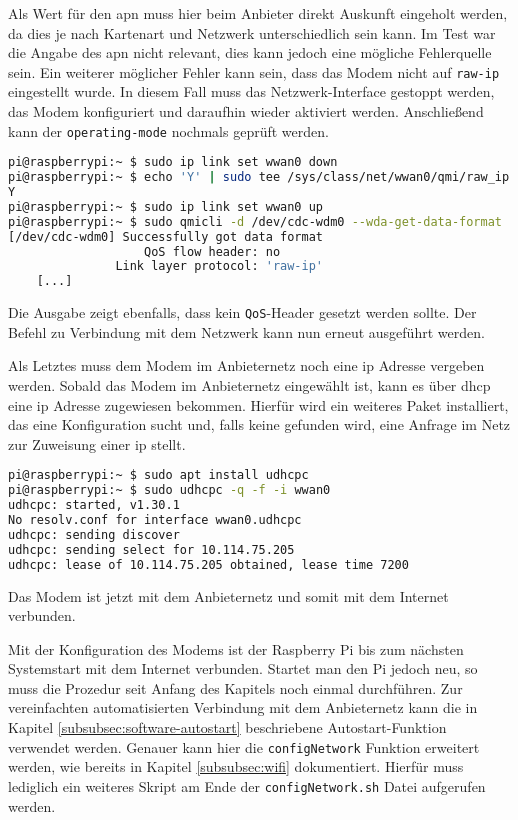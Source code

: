 \noindent Als Wert für den \gls{apn} muss hier beim Anbieter direkt Auskunft eingeholt werden, da dies je nach Kartenart und Netzwerk
unterschiedlich sein kann.
Im Test war die Angabe des \gls{apn} nicht relevant, dies kann jedoch eine mögliche Fehlerquelle sein.
Ein weiterer möglicher Fehler kann sein, dass das Modem nicht auf \texttt{raw-ip} eingestellt wurde.
In diesem Fall muss das Netzwerk-Interface gestoppt werden, das Modem konfiguriert und daraufhin wieder aktiviert werden.
Anschließend kann der \texttt{operating-mode} nochmals geprüft werden.

\begin{lstlisting}[language=Bash]
pi@raspberrypi:~ $ sudo ip link set wwan0 down
pi@raspberrypi:~ $ echo 'Y' | sudo tee /sys/class/net/wwan0/qmi/raw_ip
Y
pi@raspberrypi:~ $ sudo ip link set wwan0 up
pi@raspberrypi:~ $ sudo qmicli -d /dev/cdc-wdm0 --wda-get-data-format
[/dev/cdc-wdm0] Successfully got data format
                   QoS flow header: no
               Link layer protocol: 'raw-ip'
    [...]
\end{lstlisting}

\noindent Die Ausgabe zeigt ebenfalls, dass kein \texttt{QoS}-Header gesetzt werden sollte.
Der Befehl zu Verbindung mit dem Netzwerk kann nun erneut ausgeführt werden.

Als Letztes muss dem Modem im Anbieternetz noch eine \gls{ip} Adresse vergeben werden.
Sobald das Modem im Anbieternetz eingewählt ist, kann es über \gls{dhcp} eine \gls{ip} Adresse zugewiesen bekommen.
Hierfür wird ein weiteres Paket installiert, das eine Konfiguration sucht und, falls keine gefunden wird, eine
Anfrage im Netz zur Zuweisung einer \gls{ip} stellt.

\begin{lstlisting}[language=Bash]
pi@raspberrypi:~ $ sudo apt install udhcpc
pi@raspberrypi:~ $ sudo udhcpc -q -f -i wwan0
udhcpc: started, v1.30.1
No resolv.conf for interface wwan0.udhcpc
udhcpc: sending discover
udhcpc: sending select for 10.114.75.205
udhcpc: lease of 10.114.75.205 obtained, lease time 7200
\end{lstlisting}

\noindent Das Modem ist jetzt mit dem Anbieternetz und somit mit dem Internet verbunden.


Mit der Konfiguration des Modems ist der Raspberry Pi bis zum nächsten Systemstart mit dem Internet verbunden.
Startet man den Pi jedoch neu, so muss die Prozedur seit Anfang des Kapitels noch einmal durchführen.
Zur vereinfachten automatisierten Verbindung mit dem Anbieternetz kann die in Kapitel \ref{subsubsec:software-autostart}
beschriebene Autostart-Funktion verwendet werden.
Genauer kann hier die \texttt{configNetwork} Funktion erweitert werden, wie bereits in Kapitel \ref{subsubsec:wifi}
dokumentiert.
Hierfür muss lediglich ein weiteres Skript am Ende der \texttt{configNetwork.sh} Datei aufgerufen werden.

